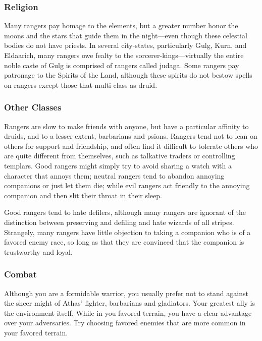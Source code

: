 \subsubsection{Religion}

Many rangers pay homage to the elements, but a greater number honor the moons and the stars that guide them in the night---even though these celestial bodies do not have priests. In several city-states, particularly Gulg,
Kurn, and Eldaarich, many rangers owe fealty to the sorcerer-kings---virtually the entire noble caste of Gulg is comprised of rangers called judaga. Some rangers pay patronage to the Spirits of the Land, although these spirits do not bestow spells on rangers except those that multi-class as druid.

\subsubsection{Other Classes}

Rangers are slow to make friends with anyone, but have a particular affinity to druids, and to a lesser extent, barbarians and psions. Rangers tend not to lean on others for support and friendship, and often find it difficult to tolerate others who are quite different from themselves, such as talkative traders or controlling templars. Good rangers might simply try to avoid sharing a watch with a character that annoys them; neutral rangers tend to abandon annoying companions or just let them die; while evil rangers act friendly to the annoying companion and then slit their throat in their sleep.

Good rangers tend to hate defilers, although many rangers are ignorant of the distinction between preserving and defiling and hate wizards of all stripes. Strangely, many rangers have little objection to taking a companion who is of a favored enemy race, so long as that they are convinced that the companion is trustworthy and loyal.

\subsubsection{Combat}

Although you are a formidable warrior, you usually prefer not to stand against the sheer might of Athas' fighter, barbarians and gladiators. Your greatest ally is the environment itself. While in you favored terrain, you have a clear advantage over your adversaries. Try choosing favored enemies that are more common in your favored terrain.

